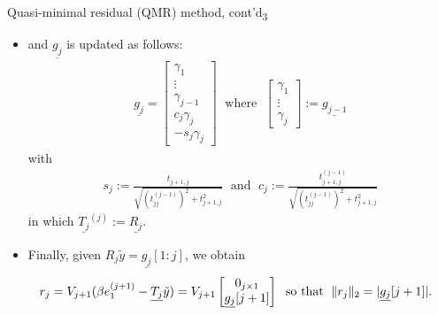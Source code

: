 \documentclass[t,usepdftitle=false]{beamer}
\begin{document}
\begin{frame}{Quasi-minimal residual (QMR) method, cont'd\textsubscript{3}}
\begin{itemize}
\item[] and $\underline{g_j}$ is updated as follows:
\begin{align*}
\underline{g_j}=
\begin{bmatrix}
\gamma_1\\
\vdots\\
\gamma_{j-1}\\
c_j\gamma_j\\
-s_j\gamma_j
\end{bmatrix}
\;\text{ where }\;
\begin{bmatrix}
\gamma_1\\
\vdots\\
\gamma_{j}
\end{bmatrix}:=\underline{g_{j-1}}
\end{align*}
with\vspace{-.4cm}
\begin{align*}
s_j:=\frac{t_{j+1,j}}{\sqrt{\left(t_{jj}^{(j-1)}\right)^2+t_{j+1,j}^2}}
\;\text{ and }\;
c_j:=\frac{t_{j+1,j}^{(j-1)}}{\sqrt{\left(t_{jj}^{(j-1)}\right)^2+t_{j+1,j}^2}}
\end{align*}
in which $\underline{T_j}^{(j)}:=\underline{R_j}$.
\item Finally, given $R_j\tilde{y}=\underline{g_j}[1:j]$, we obtain
\begin{align*}
\hspace{-.25cm}
r_j=
V_{j+1}(\beta e^{(j+1)}_1-\underline{T_j}\tilde{y})=
V_{j+1}\begin{bmatrix}0_{j\times 1}\\\underline{g_j}[j+1]\end{bmatrix}
\;\text{ so that }\;
\|r_j\|_2=|\underline{g_j}[j+1]|.
\end{align*}
\end{itemize}
\end{frame}
\end{document}
